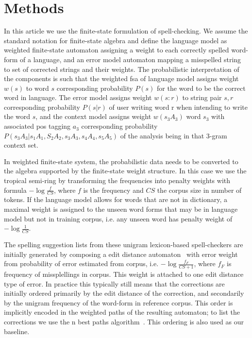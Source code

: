\documentclass{llncs}
\begin{document}
\section{Methods}
\label{sec:methods}

In this article we use the finite-state formulation of spell-checking. We
assume the standard notation for finite-state algebra and define the language
model as weighted finite-state automaton assigning a weight to each correctly
spelled word-form of a language, and an error model automaton mapping a
misspelled string to set of corrected strings and their weights. The
probabilistic interpretation of the components is such that the weighted fsa of
language model assigns weight $w(s)$ to word $s$ corresponding probability
$P(s)$ for the word to be the correct word in language. The error model assigns
weight $w(s:r)$ to string pair $s, r$ corresponding probability $P(s|r)$ of
user writing word r when intending to write the word $s$, and the context model
assigns weight $w(s_3 A_3)$ word $s_3$ with associated pos tagging $a_3$
corresponding probability $P(s_3 A_3|s_1 A_1, S_2 A_2, s_3 A_3, s_4 A_4, s_5
A_5)$ of the analysis being in that 3-gram context set.

In weighted finite-state system, the probabilistic data needs to be converted
to the algebra supported by the finite-state weight structure.
In this case we use the tropical semi-ring by transforming the
frequencies into penalty weights with formula $-\log\frac{f}{CS}$, where $f$ is
the frequency and $CS$ the corpus size in number of tokens. If the language
model allows for words that are not in dictionary, a maximal weight is assigned
to the unseen word forms that may be in language model but not in training
corpus, i.e.  any unseen word has penalty weight of $-\log\frac{1}{CS}$.

The spelling suggestion lists from these unigram lexicon-based spell-checkers
are initially generated by composing a edit distance
automaton~\cite{agata/2002} with error weight from probability of error
estimated from corpus, i.e. $-\log\frac{f_{F}}{CS+1}$, where $f_F$ is frequency
of missplellings in corpus. This weight is attached to one edit distance type
of error. In practice this typically still means that the corrections are
initially ordered primarily by the edit distance of the correction, and
secondarily by the unigram frequency of the word-form in reference corpus.
This order is implicitly encoded in the weighted paths of the resulting
automaton; to list the corrections we use the n best paths
algorithm~\cite{mohri/2002}. This ordering is also used as our baseline.
\end{document}
